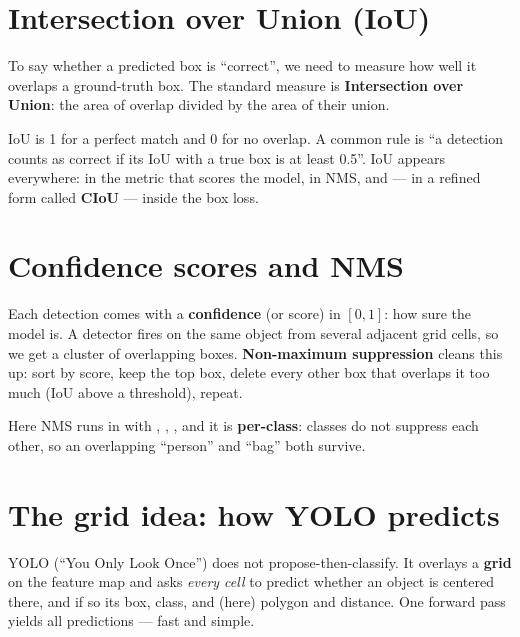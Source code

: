 \section{Intersection over Union (IoU)}
To say whether a predicted box is ``correct'', we need to measure how well it overlaps a
ground-truth box. The standard measure is \textbf{Intersection over Union}: the area of
overlap divided by the area of their union.

\begin{center}
\end{center}

\noindent IoU is 1 for a perfect match and 0 for no overlap. A common rule is ``a
detection counts as correct if its IoU with a true box is at least 0.5''. IoU appears
everywhere: in the metric that scores the model, in NMS, and --- in a refined form called
\textbf{CIoU} --- inside the box loss.

\section{Confidence scores and NMS}
Each detection comes with a \textbf{confidence} (or score) in $[0,1]$: how sure the model
is. A detector fires on the same object from several adjacent grid cells, so we get a
cluster of overlapping boxes. \textbf{Non-maximum suppression} cleans this up: sort by
score, keep the top box, delete every other box that overlaps it too much (IoU above a
threshold), repeat.

\begin{hood}
Here NMS runs in  with ,
, , and it is \textbf{per-class}: classes
do not suppress each other, so an overlapping ``person'' and ``bag'' both survive.
\end{hood}

\section{The grid idea: how YOLO predicts}
YOLO (``You Only Look Once'') does not propose-then-classify. It overlays a \textbf{grid}
on the feature map and asks \emph{every cell} to predict whether an object is centered
there, and if so its box, class, and (here) polygon and distance. One forward pass yields
all predictions --- fast and simple.

